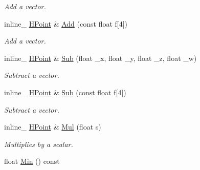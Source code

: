 \begin{DoxyCompactItemize}
\begin{DoxyCompactList}\small\item\em Add a vector. \end{DoxyCompactList}\item 
inline\+\_\+ \hyperlink{classOpcode_1_1HPoint}{H\+Point} \& \hyperlink{classOpcode_1_1HPoint_a61a08e6a9d0c05ffc6efaee794d50cb3}{Add} (const float f\mbox{[}4\mbox{]})\hypertarget{classOpcode_1_1HPoint_a61a08e6a9d0c05ffc6efaee794d50cb3}{}\label{classOpcode_1_1HPoint_a61a08e6a9d0c05ffc6efaee794d50cb3}

\begin{DoxyCompactList}\small\item\em Add a vector. \end{DoxyCompactList}\item 
inline\+\_\+ \hyperlink{classOpcode_1_1HPoint}{H\+Point} \& \hyperlink{classOpcode_1_1HPoint_a771f8cd254a4118d52a2a0dca4959241}{Sub} (float \+\_\+x, float \+\_\+y, float \+\_\+z, float \+\_\+w)\hypertarget{classOpcode_1_1HPoint_a771f8cd254a4118d52a2a0dca4959241}{}\label{classOpcode_1_1HPoint_a771f8cd254a4118d52a2a0dca4959241}

\begin{DoxyCompactList}\small\item\em Subtract a vector. \end{DoxyCompactList}\item 
inline\+\_\+ \hyperlink{classOpcode_1_1HPoint}{H\+Point} \& \hyperlink{classOpcode_1_1HPoint_afae189f17b5821d15eb433a70b00db68}{Sub} (const float f\mbox{[}4\mbox{]})\hypertarget{classOpcode_1_1HPoint_afae189f17b5821d15eb433a70b00db68}{}\label{classOpcode_1_1HPoint_afae189f17b5821d15eb433a70b00db68}

\begin{DoxyCompactList}\small\item\em Subtract a vector. \end{DoxyCompactList}\item 
inline\+\_\+ \hyperlink{classOpcode_1_1HPoint}{H\+Point} \& \hyperlink{classOpcode_1_1HPoint_ab4bd0067921acdb66315ed61fdea86d6}{Mul} (float s)\hypertarget{classOpcode_1_1HPoint_ab4bd0067921acdb66315ed61fdea86d6}{}\label{classOpcode_1_1HPoint_ab4bd0067921acdb66315ed61fdea86d6}

\begin{DoxyCompactList}\small\item\em Multiplies by a scalar. \end{DoxyCompactList}\item 
float \hyperlink{classOpcode_1_1HPoint_a8d3fcb4135e20b8d40e25d30d7db31f9}{Min} () const \hypertarget{classOpcode_1_1HPoint_a8d3fcb4135e20b8d40e25d30d7db31f9}{}\label{classOpcode_1_1HPoint_a8d3fcb4135e20b8d40e25d30d7db31f9}


\end{DoxyCompactItemize}

